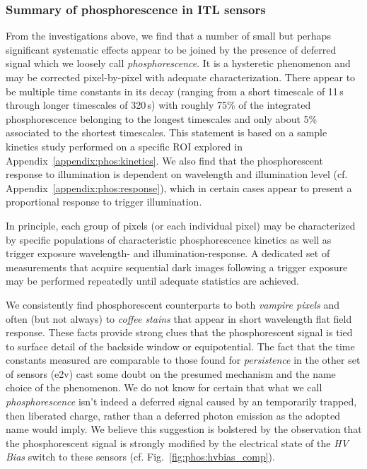 \subsubsection{Summary of phosphorescence in ITL sensors}
From the investigations above, we find that a number of small but perhaps significant systematic effects appear to be joined by the presence of deferred signal which we loosely call {\it phosphorescence}. It is a hysteretic phenomenon and may be corrected pixel-by-pixel with adequate characterization. There appear to be multiple time constants in its decay (ranging from a short timescale of 11\,s through longer timescales of 320\,s) with roughly 75\% of the integrated phosphorescence belonging to the longest timescales and only about 5\% associated to the shortest timescales. This statement is based on a sample kinetics study performed on a specific ROI explored in Appendix~\ref{appendix:phos:kinetics}. We also find that the phosphorescent response to illumination is dependent on wavelength and illumination level (cf. Appendix~\ref{appendix:phos:response}), which in certain cases appear to present a proportional response to trigger illumination.

In principle, each group of pixels (or each individual pixel) may be characterized by specific populations of characteristic phosphorescence kinetics as well as trigger exposure wavelength- and illumination-response. A dedicated set of measurements that acquire sequential dark images following a trigger exposure may be performed repeatedly until adequate statistics are achieved.

We consistently find phosphorescent counterparts to both {\it vampire pixels} and often (but not always) to {\it coffee stains} that appear in short wavelength flat field response. These facts provide strong clues that the phosphorescent signal is tied to surface detail of the backside window or equipotential. The fact that the time constants measured are comparable to those found for {\it persistence} in the other set of sensors (e2v) cast some doubt on the presumed mechanism and the name choice of the phenomenon. We do not know for certain that what we call {\it phosphorescence} isn't indeed a deferred signal caused by an temporarily trapped, then liberated charge, rather than a deferred photon emission as the adopted name would imply. We believe this suggestion is bolstered by the observation that the phosphorescent signal is strongly modified by the electrical state of the {\it HV Bias} switch to these sensors (cf. Fig.~\ref{fig:phos:hvbias_comp}).

